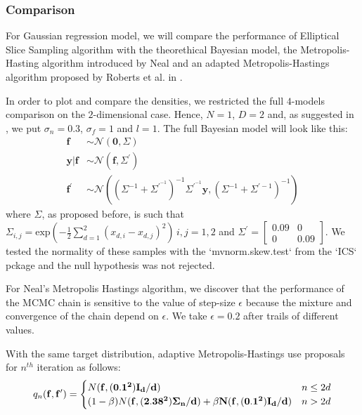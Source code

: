 \documentclass{article}
\begin{document}
\subsubsection{Comparison}
For Gaussian regression model, we will compare the performance of Elliptical Slice Sampling algorithm with the theorethical Bayesian model, the Metropolis-Hasting algorithm introduced by Neal \cite{Neal} and an adapted Metropolis-Hastings algorithm proposed by Roberts et al. in \cite{Roberts}. 

In order to plot and compare the densities, we restricted the full $4$-models comparison on the $2$-dimensional case. Hence, $N=1$, $D=2$ and, as suggested in \cite{MAM}, we put $\sigma_n=0.3$, $\sigma_f=1$ and $l=1$.
The full Bayesian model will look like this:
\begin{align*}
\mathbf{f}&\sim \mathcal{N}\left(\mathbf{0},\Sigma\right)\\
\mathbf{y}|\mathbf{f}&\sim\mathcal{N}\left(\mathbf{f},\Sigma^{'}\right)\\
\mathbf{f^'}&\sim\mathcal{N}\left(\left(\Sigma^{-1}+\Sigma^{'}^{-1}\right)^{-1}\Sigma^{'}^{-1}\mathbf{y},\left(\Sigma^{-1}+\Sigma^{'-1}\right)^{-1}\right)
\end{align*}
where $\Sigma$, as proposed before, is such that $\Sigma_{i,j}=\text{exp}\left(-\frac{1}{2}\sum_{d=1}^{2}(x_{d,i} - x_{d,j})^2\right)\,i,j=1,2$ and $\Sigma^{'}=\begin{bmatrix}0.09 & 0 \\ 0 & 0.09\end{bmatrix}$.
We tested the normality of these samples with the `mvnorm.skew.test` from the `ICS` pckage and the null hypothesis was not rejected.

For Neal's Metropolis Hastings algorithm, we discover that the performance of the MCMC chain is sensitive to the value of step-size $\epsilon$ because the mixture and convergence of the chain depend on $\epsilon$. We take $\epsilon = 0.2$ after trails of different values. 

With the same target distribution, adaptive Metropolis-Hastings use proposals for $n^{th}$ iteration as follows:\\
\begin{equation}
    q_n(\bf{f},\bf{f'}) = 
    \begin{cases}
     N(\bf{f},(0.1^2)I_d/d) & n\leq 2d \\
        (1-\beta)N(\bf{f},(2.38^2)\Sigma_n/d) + \beta N(\bf{f},(0.1^2)I_d/d) & n > 2d \\
    \end{cases}
\end{equation}
\end{document}
